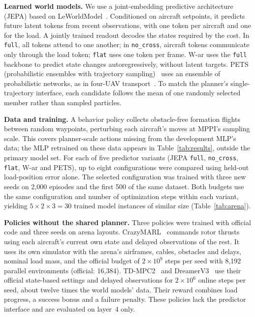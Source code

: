 \documentclass[conference]{IEEEtran}
\begin{document}
\textbf{Learned world models.} We use a joint-embedding predictive architecture (JEPA) based on LeWorldModel~\cite{maes2026leworldmodel}. Conditioned on aircraft setpoints, it predicts future latent tokens from recent observations, with one token per aircraft and one for the load. A jointly trained readout decodes the states required by the cost. In \texttt{full}, all tokens attend to one another; in \texttt{no\_cross}, aircraft tokens communicate only through the load token; \texttt{flat} uses one token per frame. W-ar uses the \texttt{full} backbone to predict state changes autoregressively, without latent targets. PETS (probabilistic ensembles with trajectory sampling)~\cite{chua2018pets} uses an ensemble of probabilistic networks, as in four-UAV transport~\cite{khursheed2024cooperative}. To match the planner's single-trajectory interface, each candidate follows the mean of one randomly selected member rather than sampled particles.

\textbf{Data and training.} A behavior policy collects obstacle-free formation flights between random waypoints, perturbing each aircraft's moves at MPPI's sampling scale. This covers planner-scale actions missing from the development MLP's data; the MLP retrained on these data appears in Table~\ref{tab:results}, outside the primary model set. For each of five predictor variants (JEPA \texttt{full}, \texttt{no\_cross}, \texttt{flat}, W-ar and PETS), up to eight configurations were compared using held-out load-position error alone. The selected configuration was trained with three new seeds on 2,000 episodes and the first 500 of the same dataset. Both budgets use the same configuration and number of optimization steps within each variant, yielding $5\times2\times3=30$ trained model instances of similar size (Table~\ref{tab:arena}).

\textbf{Policies without the shared planner.} Three policies were trained with official code and three seeds on arena layouts. CrazyMARL~\cite{lorentz2026crazymarl} commands rotor thrusts using each aircraft's current own state and delayed observations of the rest. It uses its own simulator with the arena's airframes, cables, obstacles and delays, nominal load mass, and the official budget of $2\times10^9$ steps per seed with 8,192 parallel environments (official: 16,384). TD-MPC2~\cite{hansen2024tdmpc2} and DreamerV3~\cite{hafner2023dreamerv3} use their official state-based settings and delayed observations for $2\times10^6$ online steps per seed, about twelve times the world models' data. Their reward combines load progress, a success bonus and a failure penalty. These policies lack the predictor interface and are evaluated on layer~4 only.
\end{document}
